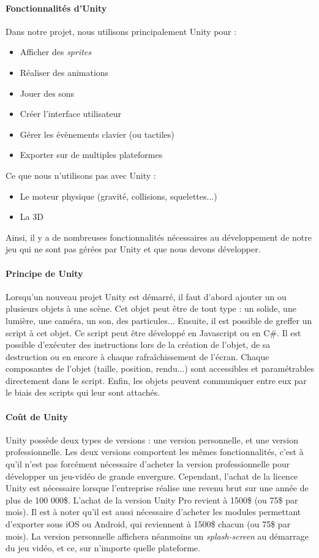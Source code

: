 \paragraph{Fonctionnalités d'Unity}
Dans notre projet, nous utilisons principalement Unity pour :
\begin{itemize}
\item Afficher des \textit{sprites}
\item Réaliser des animations
\item Jouer des sons
\item Créer l'interface utilisateur
\item Gérer les évènements clavier (ou tactiles)
\item Exporter sur de  multiples plateformes
\end{itemize}
Ce que nous n'utilisons pas avec Unity :
\begin{itemize}
\item Le moteur physique (gravité, collisions, squelettes...)
\item La 3D
\end{itemize}
Ainsi, il y a de nombreuses fonctionnalités nécessaires au développement de notre jeu qui ne sont pas gérées par Unity et que nous devons développer.
 
\paragraph{Principe de Unity}
Lorsqu'un nouveau projet Unity est démarré, il faut d'abord ajouter un ou plusieurs objets à une scène. Cet objet peut être de tout type : un solide, une lumière, une caméra, un son, des particules... Ensuite, il est possible de greffer un script à cet objet. Ce script peut être développé en Javascript ou en C\#. Il est possible d'exécuter des instructions lors de la création de l'objet, de sa destruction ou en encore à chaque rafraîchissement de l'écran. Chaque composantes de l'objet (taille, position, rendu...) sont accessibles et paramétrables directement dans le script. Enfin, les objets peuvent communiquer entre eux par le biais des scripts qui leur sont attachés.

\paragraph{Coût de Unity}
Unity possède deux types de versions : une version personnelle, et une version professionnelle. Les deux versions comportent les mêmes fonctionnalités, c'est à qu'il n'est pas forcément nécessaire d'acheter la version professionnelle pour développer un jeu-vidéo de grande envergure. Cependant, l'achat de la licence Unity est nécessaire lorsque l'entreprise réalise une revenu brut sur une année de plus de 100 000\$. L'achat de la version Unity Pro revient à 1500\$ (ou 75\$ par mois). Il est à noter qu'il est aussi nécessaire d'acheter les modules permettant d'exporter sous iOS ou Android, qui reviennent à 1500\$ chacun (ou 75\$ par mois). La version personnelle affichera néanmoins un \textit{splash-screen} au démarrage du jeu vidéo, et ce, sur n'importe quelle plateforme.

